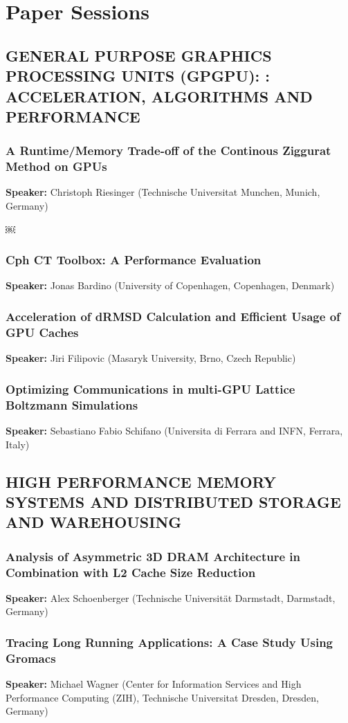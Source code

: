 \documentclass[twocolumn]{article}
\begin{document}
\section{Paper Sessions}
\subsection{GENERAL PURPOSE GRAPHICS PROCESSING UNITS (GPGPU): : ACCELERATION, ALGORITHMS AND PERFORMANCE}

\subsubsection{A Runtime/Memory Trade-off of the Continous Ziggurat Method on GPUs}
\textbf{Speaker:} Christoph Riesinger (Technische Universitat Munchen, Munich, Germany)

￼\subsubsection{Cph CT Toolbox: A Performance Evaluation}
\textbf{Speaker:} Jonas Bardino (University of Copenhagen, Copenhagen, Denmark)

\subsubsection{Acceleration of dRMSD Calculation and Efficient Usage of GPU Caches}
\textbf{Speaker:} Jiri Filipovic (Masaryk University, Brno, Czech Republic)

\subsubsection{Optimizing Communications in multi-GPU Lattice Boltzmann Simulations}
\textbf{Speaker:} Sebastiano Fabio Schifano (Universita di Ferrara and INFN, Ferrara, Italy)

\subsection{HIGH PERFORMANCE MEMORY SYSTEMS AND DISTRIBUTED STORAGE AND WAREHOUSING}
\subsubsection{Analysis of Asymmetric 3D DRAM Architecture in Combination with L2 Cache Size Reduction}
\textbf{Speaker:} Alex Schoenberger (Technische Universität Darmstadt, Darmstadt, Germany)
\subsubsection{Tracing Long Running Applications: A Case Study Using Gromacs}
\textbf{Speaker:} Michael Wagner (Center for Information Services and High Performance Computing (ZIH), Technische Universitat Dresden, Dresden, Germany)
\end{document}

